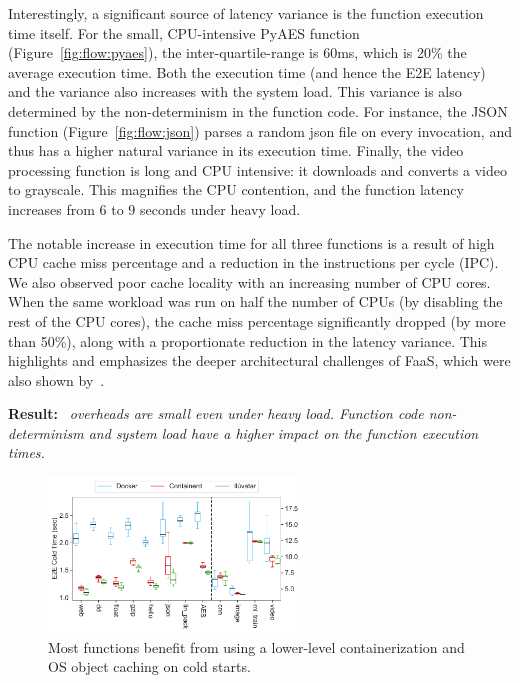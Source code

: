 Interestingly, a significant source of latency variance is the function execution time itself. 
For the small, CPU-intensive PyAES function (Figure~\ref{fig:flow:pyaes}), the  inter-quartile-range is 60ms, which is 20\% the average execution time.
Both the execution time (and hence the E2E latency) and the variance also increases with the system load.
%
This variance is also determined by the non-determinism in the function code.
For instance, the JSON function (Figure~\ref{fig:flow:json}) parses a random json file on every invocation, and thus has a higher natural variance in its execution time.
%
Finally, the video processing function is long and CPU intensive: it downloads and converts a video to grayscale. 
This magnifies the CPU contention, and the function latency increases from 6 to 9 seconds under heavy load.
%


The notable increase in execution time for all three functions is a result of  high  CPU cache miss percentage and a reduction in the instructions per cycle (IPC).
%
We also observed poor cache locality with an increasing number of CPU cores. When the same workload was run on half the number of CPUs (by disabling the rest of the CPU cores), the cache miss percentage significantly dropped (by more than 50\%), along with a proportionate reduction in the latency variance.
%
This highlights and emphasizes the deeper architectural challenges of FaaS, which were also shown by~\cite{shahrad_architectural_2019}. 

\noindent \textbf{Result:} \emph{\sysname~overheads are small even under heavy load. Function code non-determinism and system load have a higher impact on the function execution times. }



\begin{figure}
  \includegraphics[width=0.6\textwidth]{iluvatar/graphs/impl/benchmark_cold_e2e.pdf}
  \caption{Most functions benefit from using a lower-level containerization and OS object caching on cold starts.}
  \label{fig:cold}
\end{figure}

